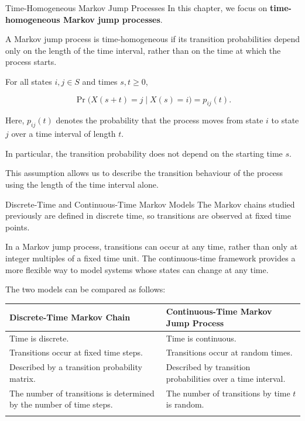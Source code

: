 \documentclass[
  ignorenonframetext,
  aspectratio=169,
]{beamer}
\newcounter{none} %
\begin{document}
\begin{frame}{Time-Homogeneous Markov Jump Processes}
\protect{}\label{time-homogeneous-markov-jump-processes}
In this chapter, we focus on \textbf{time-homogeneous Markov jump
processes}.

A Markov jump process is time-homogeneous if its transition
probabilities depend only on the length of the time interval, rather
than on the time at which the process starts.

For all states \(i,j\in S\) and times \(s,t\geq 0\),

\[
\Pr\bigl(X(s+t)=j\mid X(s)=i\bigr)
=p_{ij}(t).
\]

Here, \(p_{ij}(t)\) denotes the probability that the process moves from
state \(i\) to state \(j\) over a time interval of length \(t\).

In particular, the transition probability does not depend on the
starting time \(s\).

This assumption allows us to describe the transition behaviour of the
process using the length of the time interval alone.
\end{frame}

\begin{frame}{Discrete-Time and Continuous-Time Markov Models}
\protect{}\label{discrete-time-and-continuous-time-markov-models}
The Markov chains studied previously are defined in discrete time, so
transitions are observed at fixed time points.

In a Markov jump process, transitions can occur at any time, rather than
only at integer multiples of a fixed time unit. The continuous-time
framework provides a more flexible way to model systems whose states can
change at any time.

The two models can be compared as follows:

{\def\LTcaptype{none} %
\begin{longtable}[]{@{}
  >{\raggedright\arraybackslash}p{}
  >{\raggedright\arraybackslash}p{}@{}}
\toprule\noalign{}
\begin{minipage}[b]{\linewidth}\raggedright
Discrete-Time Markov Chain
\end{minipage} & \begin{minipage}[b]{\linewidth}\raggedright
Continuous-Time Markov Jump Process
\end{minipage} \\
\midrule\noalign{}
\endhead
Time is discrete. & Time is continuous. \\
Transitions occur at fixed time steps. & Transitions occur at random
times. \\
Described by a transition probability matrix. & Described by transition
probabilities over a time interval. \\
The number of transitions is determined by the number of time steps. &
The number of transitions by time \(t\) is random. \\
\bottomrule\noalign{}
\end{longtable}
}
\end{frame}
\end{document}
